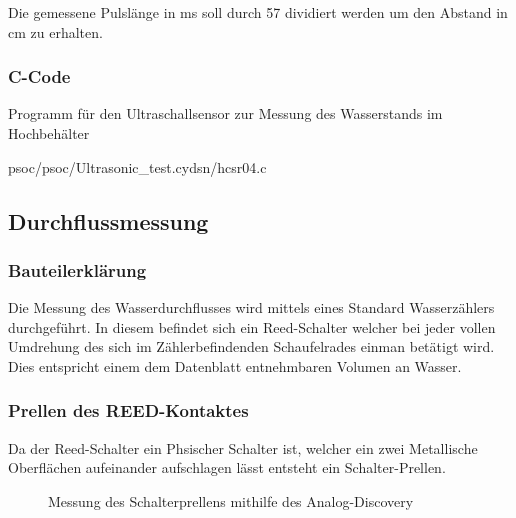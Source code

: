\documentclass[12pt,a4paper]{article}
\begin{document}
	Die gemessene Pulslänge in ms soll durch 57 dividiert werden um den
	Abstand in cm zu erhalten.

	\subsubsection{C-Code}
	
	Programm für den Ultraschallsensor zur Messung des Wasserstands im 
	Hochbehälter

	
	{psoc/psoc/Ultrasonic_test.cydsn/hcsr04.c}

	
\subsection{Durchflussmessung}

\subsubsection{Bauteilerklärung}

Die Messung des Wasserdurchflusses wird mittels eines Standard Wasserzählers
durchgeführt. In diesem befindet sich ein Reed-Schalter welcher bei jeder vollen
Umdrehung des sich im Zählerbefindenden Schaufelrades einman betätigt wird. Dies
entspricht einem dem Datenblatt entnehmbaren Volumen an Wasser.

\subsubsection{Prellen des REED-Kontaktes}

Da der Reed-Schalter ein Phsischer Schalter ist, welcher ein zwei Metallische
Oberflächen aufeinander aufschlagen lässt entsteht ein Schalter-Prellen.
\begin{figure}[H]
	
	\centering
	\label{fig:prellen}

	\caption{Messung des Schalterprellens mithilfe des Analog-Discovery}
\end{figure}
\end{document}
